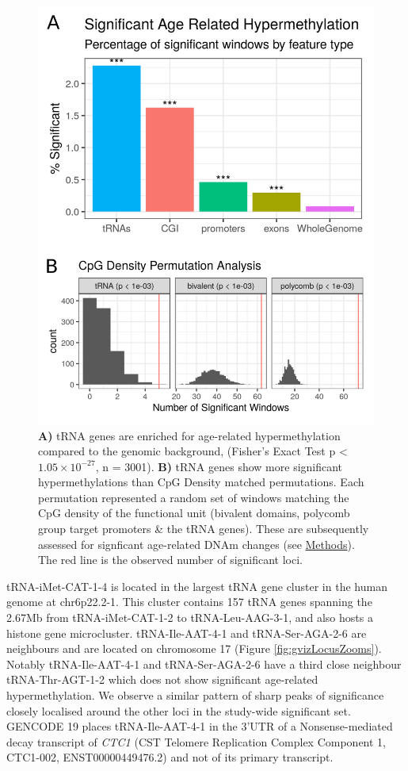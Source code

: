 \documentclass[
]{book}
\begin{document}
\begin{figure}

{\centering \includegraphics[width=0.6\linewidth]{./figs/permutation-proportion} 

}

\caption{\textbf{A)} tRNA genes are enriched for age-related hypermethylation compared to the genomic background, (Fisher's Exact Test p \textless{} \(1.05\times10^{-27}\), n = 3001). \textbf{B)} tRNA genes show more significant hypermethylations than CpG Density matched permutations. Each permutation represented a random set of windows matching the CpG density of the functional unit (bivalent domains, polycomb group target promoters \& the tRNA genes). These are subsequently assessed for signficant age-related DNAm changes (see \protect\hyperlink{AgeErichmentPermutation}{Methods}). The red line is the observed number of significant loci.}\label{fig:sizePropEnrich}
\end{figure}



tRNA-iMet-CAT-1-4 is located in the largest tRNA gene cluster in the human genome at chr6p22.2-1.
This cluster contains 157 tRNA genes spanning the 2.67Mb from tRNA-iMet-CAT-1-2 to tRNA-Leu-AAG-3-1, and also hosts a histone gene microcluster.
tRNA-Ile-AAT-4-1 and tRNA-Ser-AGA-2-6 are neighbours and are located on chromosome 17 (Figure \ref{fig:gvizLocusZooms}).
Notably tRNA-Ile-AAT-4-1 and tRNA-Ser-AGA-2-6 have a third close neighbour tRNA-Thr-AGT-1-2 which does not show significant age-related hypermethylation.
We observe a similar pattern of sharp peaks of significance closely localised around the other loci in the study-wide significant set.
GENCODE 19 places tRNA-Ile-AAT-4-1 in the 3'UTR of a Nonsense-mediated decay transcript of \emph{CTC1} (CST Telomere Replication Complex Component 1, CTC1-002, ENST00000449476.2) and not of its primary transcript.
\end{document}
